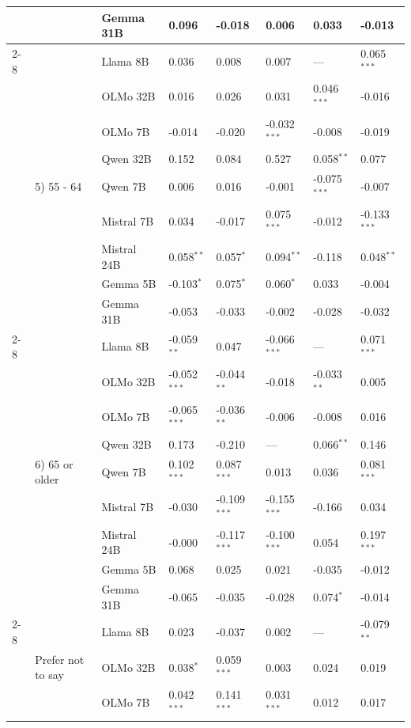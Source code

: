 \begin{longtable}[t]{llllllll}
 &  & Gemma 31B & 0.096 & -0.018 & 0.006 & 0.033 & -0.013 \\
\cline{2-8}
 & \multirow[t]{9}{*}{5) 55 - 64} & Llama 8B & 0.036 & 0.008 & 0.007 & --- & 0.065$^{***}$ \\
 &  & OLMo 32B & 0.016 & 0.026 & 0.031 & 0.046$^{***}$ & -0.016 \\
 &  & OLMo 7B & -0.014 & -0.020 & -0.032$^{***}$ & -0.008 & -0.019 \\
 &  & Qwen 32B & 0.152 & 0.084 & 0.527 & 0.058$^{**}$ & 0.077 \\
 &  & Qwen 7B & 0.006 & 0.016 & -0.001 & -0.075$^{***}$ & -0.007 \\
 &  & Mistral 7B & 0.034 & -0.017 & 0.075$^{***}$ & -0.012 & -0.133$^{***}$ \\
 &  & Mistral 24B & 0.058$^{**}$ & 0.057$^{*}$ & 0.094$^{**}$ & -0.118 & 0.048$^{**}$ \\
 &  & Gemma 5B & -0.103$^{*}$ & 0.075$^{*}$ & 0.060$^{*}$ & 0.033 & -0.004 \\
 &  & Gemma 31B & -0.053 & -0.033 & -0.002 & -0.028 & -0.032 \\
\cline{2-8}
 & \multirow[t]{9}{*}{6) 65 or older} & Llama 8B & -0.059$^{**}$ & 0.047 & -0.066$^{***}$ & --- & 0.071$^{***}$ \\
 &  & OLMo 32B & -0.052$^{***}$ & -0.044$^{**}$ & -0.018 & -0.033$^{**}$ & 0.005 \\
 &  & OLMo 7B & -0.065$^{***}$ & -0.036$^{**}$ & -0.006 & -0.008 & 0.016 \\
 &  & Qwen 32B & 0.173 & -0.210 & --- & 0.066$^{**}$ & 0.146 \\
 &  & Qwen 7B & 0.102$^{***}$ & 0.087$^{***}$ & 0.013 & 0.036 & 0.081$^{***}$ \\
 &  & Mistral 7B & -0.030 & -0.109$^{***}$ & -0.155$^{***}$ & -0.166 & 0.034 \\
 &  & Mistral 24B & -0.000 & -0.117$^{***}$ & -0.100$^{***}$ & 0.054 & 0.197$^{***}$ \\
 &  & Gemma 5B & 0.068 & 0.025 & 0.021 & -0.035 & -0.012 \\
 &  & Gemma 31B & -0.065 & -0.035 & -0.028 & 0.074$^{*}$ & -0.014 \\
\cline{2-8}
 & \multirow[t]{9}{*}{Prefer not to say} & Llama 8B & 0.023 & -0.037 & 0.002 & --- & -0.079$^{**}$ \\
 &  & OLMo 32B & 0.038$^{*}$ & 0.059$^{***}$ & 0.003 & 0.024 & 0.019 \\
 &  & OLMo 7B & 0.042$^{***}$ & 0.141$^{***}$ & 0.031$^{***}$ & 0.012 & 0.017 \\

\end{longtable}
